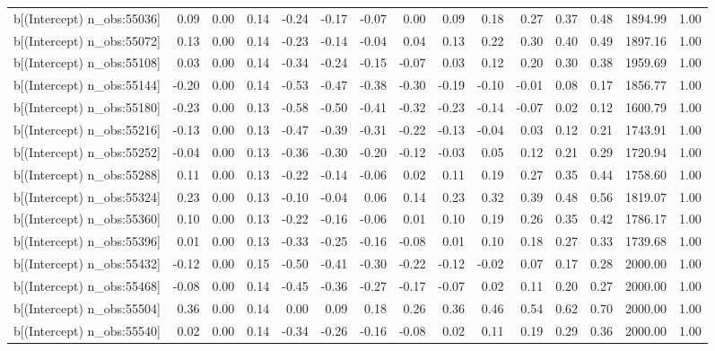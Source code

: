 \begin{table}[ht]
\begin{tabular}{rrrrrrrrrrrrrrr}
  b[(Intercept) n\_obs:55036] & 0.09 & 0.00 & 0.14 & -0.24 & -0.17 & -0.07 & 0.00 & 0.09 & 0.18 & 0.27 & 0.37 & 0.48 & 1894.99 & 1.00 \\ 
  b[(Intercept) n\_obs:55072] & 0.13 & 0.00 & 0.14 & -0.23 & -0.14 & -0.04 & 0.04 & 0.13 & 0.22 & 0.30 & 0.40 & 0.49 & 1897.16 & 1.00 \\ 
  b[(Intercept) n\_obs:55108] & 0.03 & 0.00 & 0.14 & -0.34 & -0.24 & -0.15 & -0.07 & 0.03 & 0.12 & 0.20 & 0.30 & 0.38 & 1959.69 & 1.00 \\ 
  b[(Intercept) n\_obs:55144] & -0.20 & 0.00 & 0.14 & -0.53 & -0.47 & -0.38 & -0.30 & -0.19 & -0.10 & -0.01 & 0.08 & 0.17 & 1856.77 & 1.00 \\ 
  b[(Intercept) n\_obs:55180] & -0.23 & 0.00 & 0.13 & -0.58 & -0.50 & -0.41 & -0.32 & -0.23 & -0.14 & -0.07 & 0.02 & 0.12 & 1600.79 & 1.00 \\ 
  b[(Intercept) n\_obs:55216] & -0.13 & 0.00 & 0.13 & -0.47 & -0.39 & -0.31 & -0.22 & -0.13 & -0.04 & 0.03 & 0.12 & 0.21 & 1743.91 & 1.00 \\ 
  b[(Intercept) n\_obs:55252] & -0.04 & 0.00 & 0.13 & -0.36 & -0.30 & -0.20 & -0.12 & -0.03 & 0.05 & 0.12 & 0.21 & 0.29 & 1720.94 & 1.00 \\ 
  b[(Intercept) n\_obs:55288] & 0.11 & 0.00 & 0.13 & -0.22 & -0.14 & -0.06 & 0.02 & 0.11 & 0.19 & 0.27 & 0.35 & 0.44 & 1758.60 & 1.00 \\ 
  b[(Intercept) n\_obs:55324] & 0.23 & 0.00 & 0.13 & -0.10 & -0.04 & 0.06 & 0.14 & 0.23 & 0.32 & 0.39 & 0.48 & 0.56 & 1819.07 & 1.00 \\ 
  b[(Intercept) n\_obs:55360] & 0.10 & 0.00 & 0.13 & -0.22 & -0.16 & -0.06 & 0.01 & 0.10 & 0.19 & 0.26 & 0.35 & 0.42 & 1786.17 & 1.00 \\ 
  b[(Intercept) n\_obs:55396] & 0.01 & 0.00 & 0.13 & -0.33 & -0.25 & -0.16 & -0.08 & 0.01 & 0.10 & 0.18 & 0.27 & 0.33 & 1739.68 & 1.00 \\ 
  b[(Intercept) n\_obs:55432] & -0.12 & 0.00 & 0.15 & -0.50 & -0.41 & -0.30 & -0.22 & -0.12 & -0.02 & 0.07 & 0.17 & 0.28 & 2000.00 & 1.00 \\ 
  b[(Intercept) n\_obs:55468] & -0.08 & 0.00 & 0.14 & -0.45 & -0.36 & -0.27 & -0.17 & -0.07 & 0.02 & 0.11 & 0.20 & 0.27 & 2000.00 & 1.00 \\ 
  b[(Intercept) n\_obs:55504] & 0.36 & 0.00 & 0.14 & 0.00 & 0.09 & 0.18 & 0.26 & 0.36 & 0.46 & 0.54 & 0.62 & 0.70 & 2000.00 & 1.00 \\ 
  b[(Intercept) n\_obs:55540] & 0.02 & 0.00 & 0.14 & -0.34 & -0.26 & -0.16 & -0.08 & 0.02 & 0.11 & 0.19 & 0.29 & 0.36 & 2000.00 & 1.00 \\ 

\end{tabular}
\end{table}

